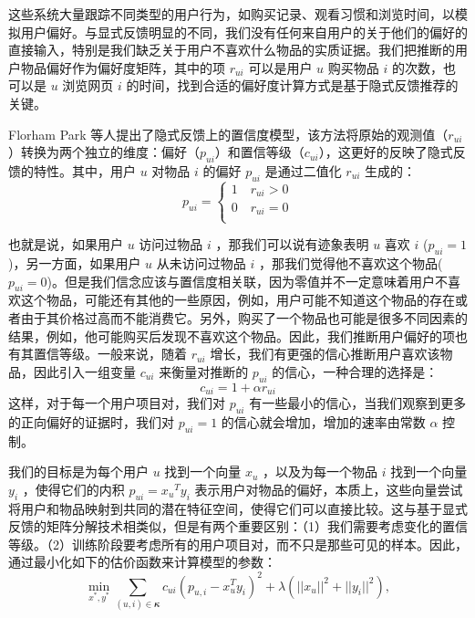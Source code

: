 这些系统大量跟踪不同类型的用户行为，如购买记录、观看习惯和浏览时间，以模拟用户偏好。与显式反馈明显的不同，我们没有任何来自用户的关于他们的偏好的直接输入，特别是我们缺乏关于用户不喜欢什么物品的实质证据。我们把推断的用户物品偏好作为偏好度矩阵，其中的项 $r_{ui}$ 可以是用户 $u$ 购买物品 $i$ 的次数，也可以是 $u$ 浏览网页 $i$ 的时间，找到合适的偏好度计算方式是基于隐式反馈推荐的关键。

Florham Park 等人提出了隐式反馈上的置信度模型\cite{Hu2008Collaborative}，该方法将原始的观测值（$r_{ui}$）转换为两个独立的维度：偏好（$p_{ui}$）和置信等级（$c_{ui}$），这更好的反映了隐式反馈的特性。其中，用户 $u$ 对物品 $i$ 的偏好 $p_{ui}$ 是通过二值化 $r_{ui}$ 生成的：
\begin{equation}
p_{ui} = 
  \begin{cases}
   1 \quad r_{ui}>0  \\
   0  \quad  r_{ui} = 0  \\
  \end{cases}
\end{equation}

也就是说，如果用户 $u$ 访问过物品 $i$ ，那我们可以说有迹象表明 $u$ 喜欢 $i$  ($p_{ui} = 1$)，另一方面，如果用户 $u$ 从未访问过物品 $i$ ，那我们觉得他不喜欢这个物品($p_{ui} = 0$)。但是我们信念应该与置信度相关联，因为零值并不一定意味着用户不喜欢这个物品，可能还有其他的一些原因，例如，用户可能不知道这个物品的存在或者由于其价格过高而不能消费它。另外，购买了一个物品也可能是很多不同因素的结果，例如，他可能购买后发现不喜欢这个物品。因此，我们推断用户偏好的项也有其置信等级。一般来说，随着 $r_{ui}$ 增长，我们有更强的信心推断用户喜欢该物品，因此引入一组变量 $c_{ui}$ 来衡量对推断的 $p_{ui}$ 的信心，一种合理的选择是：
$$
c_{ui} = 1 + \alpha r_{ui}
$$
这样，对于每一个用户项目对，我们对 $p_{ui}​$ 有一些最小的信心，当我们观察到更多的正向偏好的证据时，我们对 $p_{ui} = 1​$ 的信心就会增加，增加的速率由常数 $\alpha$ 控制。

我们的目标是为每个用户 $u$ 找到一个向量 $x_u$ ，以及为每一个物品 $i$ 找到一个向量 $y_i$ ，使得它们的内积 $p_{ui} = {x_u}^T y_i$ 表示用户对物品的偏好，本质上，这些向量尝试将用户和物品映射到共同的潜在特征空间，使得它们可以直接比较。这与基于显式反馈的矩阵分解技术相类似，但是有两个重要区别：（1）我们需要考虑变化的置信等级。（2）训练阶段要考虑所有的用户项目对，而不只是那些可见的样本。因此，通过最小化如下的估价函数来计算模型的参数：
\begin{equation}
\min_{x^*, y^*} {\sum\limits_{(u,i) \in 𝜿} {  c_{ui}  {(p_{u,i}-x_u^Ty_i)}^2 + \lambda(||x_u||^2 + ||y_i||^2)} } ,
\end{equation}


